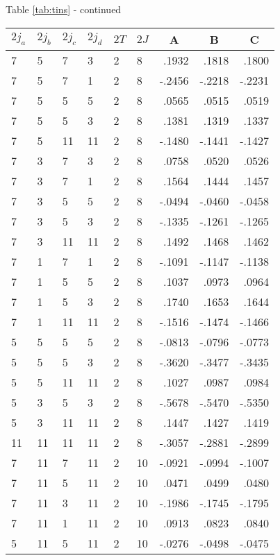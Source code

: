 \begin{center}{Table \ref{tab:tins} - continued}\end{center}
\clearpage
\small
\begin{center}
\begin{tabular}{llllllrrr}
\hline
$2j_{a}$&$2j_{b}$&$2j_{c}$&$2j_{d}$&$2T$&$2J$&
\multicolumn{1}{c}{A}&
\multicolumn{1}{c}{B}&
\multicolumn{1}{c}{C}
\\\hline
  7& 5& 7& 3& 2& 8&   .1932&   .1818&   .1800\\
  7& 5& 7& 1& 2& 8&  -.2456&  -.2218&  -.2231\\
  7& 5& 5& 5& 2& 8&   .0565&   .0515&   .0519\\
  7& 5& 5& 3& 2& 8&   .1381&   .1319&   .1337\\
  7& 5&11&11& 2& 8&  -.1480&  -.1441&  -.1427\\
  7& 3& 7& 3& 2& 8&   .0758&   .0520&   .0526\\
  7& 3& 7& 1& 2& 8&   .1564&   .1444&   .1457\\
  7& 3& 5& 5& 2& 8&  -.0494&  -.0460&  -.0458\\
  7& 3& 5& 3& 2& 8&  -.1335&  -.1261&  -.1265\\
  7& 3&11&11& 2& 8&   .1492&   .1468&   .1462\\
  7& 1& 7& 1& 2& 8&  -.1091&  -.1147&  -.1138\\
  7& 1& 5& 5& 2& 8&   .1037&   .0973&   .0964\\
  7& 1& 5& 3& 2& 8&   .1740&   .1653&   .1644\\
  7& 1&11&11& 2& 8&  -.1516&  -.1474&  -.1466\\
  5& 5& 5& 5& 2& 8&  -.0813&  -.0796&  -.0773\\
  5& 5& 5& 3& 2& 8&  -.3620&  -.3477&  -.3435\\
  5& 5&11&11& 2& 8&   .1027&   .0987&   .0984\\
  5& 3& 5& 3& 2& 8&  -.5678&  -.5470&  -.5350\\
  5& 3&11&11& 2& 8&   .1447&   .1427&   .1419\\
 11&11&11&11& 2& 8&  -.3057&  -.2881&  -.2899\\
  7&11& 7&11& 2&10&  -.0921&  -.0994&  -.1007\\
  7&11& 5&11& 2&10&   .0471&   .0499&   .0480\\
  7&11& 3&11& 2&10&  -.1986&  -.1745&  -.1795\\
  7&11& 1&11& 2&10&   .0913&   .0823&   .0840\\
  5&11& 5&11& 2&10&  -.0276&  -.0498&  -.0475\\
\hline
\end{tabular}
\end{center}
